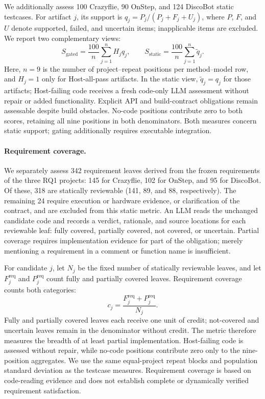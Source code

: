 We additionally assess 100 Crazyflie, 90 OnStep, and 124 DiscoBot static testcases. For artifact $j$, its support is $q_j=P_j/(P_j+F_j+U_j)$, where $P$, $F$, and $U$ denote supported, failed, and uncertain items; inapplicable items are excluded. We report two complementary views:
\begin{equation}
S_{\mathrm{gated}}=\frac{100}{n}\sum_{j=1}^{n}H_jq_j,
\qquad
S_{\mathrm{static}}=\frac{100}{n}\sum_{j=1}^{n}\widetilde q_j.
\end{equation}
Here, $n=9$ is the number of project--repeat positions per method--model row, and $H_j=1$ only for Host-all-pass artifacts. In the static view, $\widetilde q_j=q_j$ for those artifacts; Host-failing code receives a fresh code-only LLM assessment without repair or added functionality. Explicit API and build-contract obligations remain assessable despite build obstacles. No-code positions contribute zero to both scores, retaining all nine positions in both denominators. Both measures concern static support; gating additionally requires executable integration.


\paragraph{Requirement coverage.}
We separately assess 342 requirement leaves derived from the frozen requirements of the three RQ1 projects: 145 for Crazyflie, 102 for OnStep, and 95 for DiscoBot. Of these, 318 are statically reviewable (141, 89, and 88, respectively). The remaining 24 require execution or hardware evidence, or clarification of the contract, and are excluded from this static metric. An LLM reads the unchanged candidate code and records a verdict, rationale, and source locations for each reviewable leaf: fully covered, partially covered, not covered, or uncertain. Partial coverage requires implementation evidence for part of the obligation; merely mentioning a requirement in a comment or function name is insufficient.

For candidate $j$, let $N_j$ be the fixed number of statically reviewable leaves, and let $F_j^{\mathrm{req}}$ and $P_j^{\mathrm{req}}$ count fully and partially covered leaves. Requirement coverage counts both categories:
\begin{equation}
c_j=\frac{F_j^{\mathrm{req}}+P_j^{\mathrm{req}}}{N_j}.
\end{equation}
Fully and partially covered leaves each receive one unit of credit; not-covered and uncertain leaves remain in the denominator without credit. The metric therefore measures the breadth of at least partial implementation. Host-failing code is assessed without repair, while no-code positions contribute zero only to the nine-position aggregates. We use the same equal-project repeat blocks and population standard deviation as the testcase measures. Requirement coverage is based on code-reading evidence and does not establish complete or dynamically verified requirement satisfaction.


